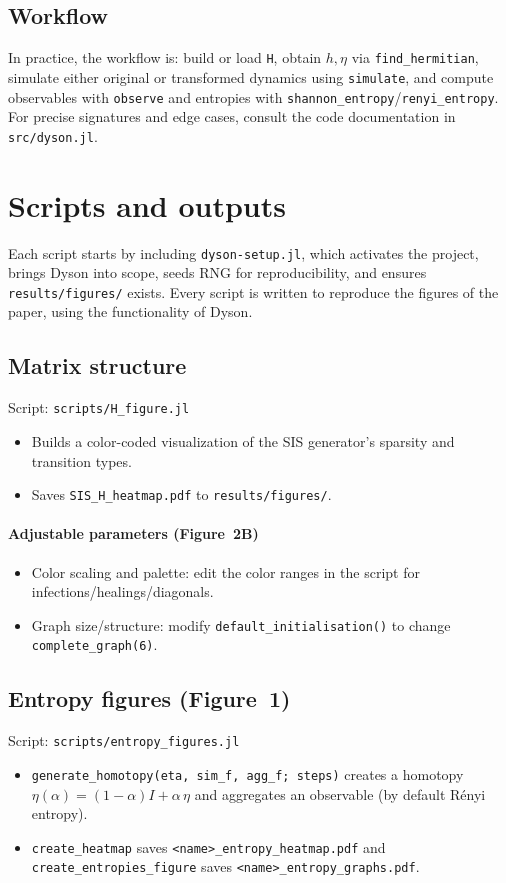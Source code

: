 \documentclass[11pt]{article}
\newcommand{\code}[1]{\texttt{#1}}
\newcommand{\pkg}[1]{\textsf{#1}}
\begin{document}
\subsection{Workflow}
In practice, the workflow is: build or load \code{H}, obtain \(h,\eta\) via \code{find\_hermitian}, simulate either original or transformed dynamics using \code{simulate}, and compute observables with \code{observe} and entropies with \code{shannon\_entropy}/\code{renyi\_entropy}. For precise signatures and edge cases, consult the code documentation in \code{src/dyson.jl}.

\section{Scripts and outputs}
Each script starts by including \code{dyson-setup.jl}, which activates the project, brings \pkg{Dyson} into scope, seeds RNG for reproducibility, and ensures \code{results/figures/} exists.
Every script is written to reproduce the figures of the paper, using the functionality of \pkg{Dyson}.

\subsection{Matrix structure}
  Script: \code{scripts/H\_figure.jl}
  \begin{itemize}
    \item Builds a color-coded visualization of the SIS generator's sparsity and transition types.
    \item Saves \code{SIS\_H\_heatmap.pdf} to \code{results/figures/}.
  \end{itemize}

  \paragraph{Adjustable parameters (Figure~2B)}
  \begin{itemize}
    \item Color scaling and palette: edit the color ranges in the script for infections/healings/diagonals.
    \item Graph size/structure: modify \code{default\_initialisation()} to change \code{complete\_graph(6)}.
  \end{itemize}

\subsection{Entropy figures (Figure~1)}
  Script: \code{scripts/entropy\_figures.jl}
  \begin{itemize}
    \item \code{generate\_homotopy(eta, sim\_f, agg\_f; steps)} creates a homotopy \(\eta(\alpha)=(1-\alpha)I+\alpha\,\eta\) and aggregates an observable (by default R\'enyi entropy).
    \item \code{create\_heatmap} saves \code{<name>\_entropy\_heatmap.pdf} and \code{create\_entropies\_figure} saves \code{<name>\_entropy\_graphs.pdf}.
  \end{itemize}
\end{document}
